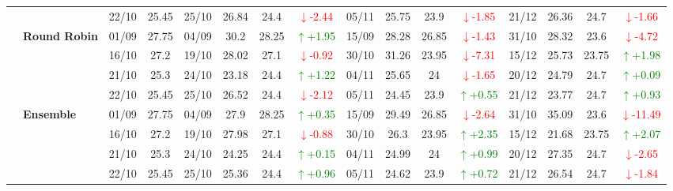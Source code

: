 {\begin{longtable}{llcc|cccc|cccc|cccc}
&
& 22/10 & 25.45 & 25/10 & 26.84 & 24.4 & \textcolor{red}{\(\downarrow\)-2.44} & 05/11 & 25.75 & 23.9 & \textcolor{red}{\(\downarrow\)-1.85} & 21/12 & 26.36 & 24.7 & \textcolor{red}{\(\downarrow\)-1.66} \\
\cmidrule(lr){2-16}


& \textbf{Round Robin}
& 01/09 & 27.75 & 04/09 & 30.2 & 28.25 & \textcolor{green}{\(\uparrow\)+1.95} & 15/09 & 28.28 & 26.85 & \textcolor{red}{\(\downarrow\)-1.43} & 31/10 & 28.32 & 23.6 & \textcolor{red}{\(\downarrow\)-4.72} \\

&
& 16/10 & 27.2 & 19/10 & 28.02 & 27.1 & \textcolor{red}{\(\downarrow\)-0.92} & 30/10 & 31.26 & 23.95 & \textcolor{red}{\(\downarrow\)-7.31} & 15/12 & 25.73 & 23.75 & \textcolor{green}{\(\uparrow\)+1.98} \\

&
& 21/10 & 25.3 & 24/10 & 23.18 & 24.4 & \textcolor{green}{\(\uparrow\)+1.22} & 04/11 & 25.65 & 24 & \textcolor{red}{\(\downarrow\)-1.65} & 20/12 & 24.79 & 24.7 & \textcolor{green}{\(\uparrow\)+0.09} \\

&
& 22/10 & 25.45 & 25/10 & 26.52 & 24.4 & \textcolor{red}{\(\downarrow\)-2.12} & 05/11 & 24.45 & 23.9 & \textcolor{green}{\(\uparrow\)+0.55} & 21/12 & 23.77 & 24.7 & \textcolor{green}{\(\uparrow\)+0.93} \\
\cmidrule(lr){2-16}



& \textbf{Ensemble}
& 01/09 & 27.75 & 04/09 & 27.9 & 28.25 & \textcolor{green}{\(\uparrow\)+0.35} & 15/09 & 29.49 & 26.85 & \textcolor{red}{\(\downarrow\)-2.64} & 31/10 & 35.09 & 23.6 & \textcolor{red}{\(\downarrow\)-11.49} \\

&
& 16/10 & 27.2 & 19/10 & 27.98 & 27.1 & \textcolor{red}{\(\downarrow\)-0.88} & 30/10 & 26.3 & 23.95 & \textcolor{green}{\(\uparrow\)+2.35} & 15/12 & 21.68 & 23.75 & \textcolor{green}{\(\uparrow\)+2.07} \\

&
& 21/10 & 25.3 & 24/10 & 24.25 & 24.4 & \textcolor{green}{\(\uparrow\)+0.15} & 04/11 & 24.99 & 24 & \textcolor{green}{\(\uparrow\)+0.99} & 20/12 & 27.35 & 24.7 & \textcolor{red}{\(\downarrow\)-2.65} \\

&
& 22/10 & 25.45 & 25/10 & 25.36 & 24.4 & \textcolor{green}{\(\uparrow\)+0.96} & 05/11 & 24.62 & 23.9 & \textcolor{green}{\(\uparrow\)+0.72} & 21/12 & 26.54 & 24.7 & \textcolor{red}{\(\downarrow\)-1.84} \\


\bottomrule
\end{longtable}
}